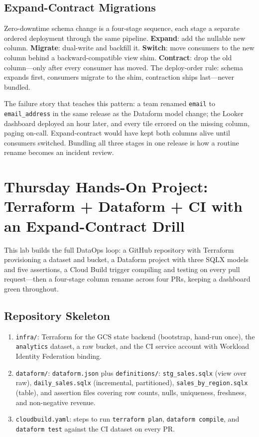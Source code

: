 \subsection{Expand-Contract Migrations}
Zero-downtime schema change is a four-stage sequence, each stage a separate ordered deployment through the same pipeline. \textbf{Expand}: add the nullable new column. \textbf{Migrate}: dual-write and backfill it. \textbf{Switch}: move consumers to the new column behind a backward-compatible view shim. \textbf{Contract}: drop the old column---only after every consumer has moved. The deploy-order rule: schema expands first, consumers migrate to the shim, contraction ships last---never bundled.

\begin{pitfall}
The failure story that teaches this pattern: a team renamed \texttt{email} to \texttt{email\_address} in the same release as the Dataform model change; the Looker dashboard deployed an hour later, and every tile errored on the missing column, paging on-call. Expand-contract would have kept both columns alive until consumers switched. Bundling all three stages in one release is how a routine rename becomes an incident review.
\end{pitfall}

\section{Thursday Hands-On Project: Terraform + Dataform + CI with an Expand-Contract Drill}
This lab builds the full DataOps loop: a GitHub repository with Terraform provisioning a dataset and bucket, a Dataform project with three SQLX models and five assertions, a Cloud Build trigger compiling and testing on every pull request---then a four-stage column rename across four PRs, keeping a dashboard green throughout.

\subsection{Repository Skeleton}
\begin{enumerate}
    \item \texttt{infra/}: Terraform for the GCS state backend (bootstrap, hand-run once), the \texttt{analytics} dataset, a raw bucket, and the CI service account with Workload Identity Federation binding.
    \item \texttt{dataform/}: \texttt{dataform.json} plus \texttt{definitions/}: \texttt{stg\_sales.sqlx} (view over raw), \texttt{daily\_sales.sqlx} (incremental, partitioned), \texttt{sales\_by\_region.sqlx} (table), and assertion files covering row counts, nulls, uniqueness, freshness, and non-negative revenue.
    \item \texttt{cloudbuild.yaml}: steps to run \texttt{terraform plan}, \texttt{dataform compile}, and \texttt{dataform test} against the CI dataset on every PR.
\end{enumerate}


